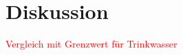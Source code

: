 \section{Diskussion}
\label{sec:diskussion}


\textcolor{red}{Vergleich mit Grenzwert für Trinkwasser}
